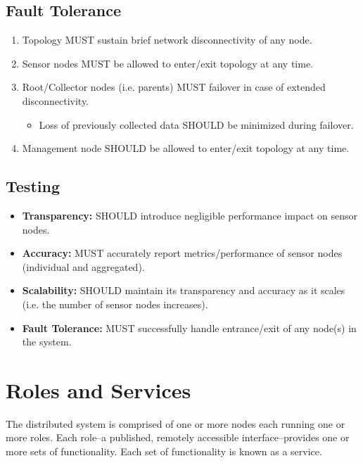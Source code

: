 \subsection{Fault Tolerance}

\begin{enumerate}

\item Topology MUST sustain brief network disconnectivity of any node.
\item Sensor nodes MUST be allowed to enter/exit topology at any time.
\item Root/Collector nodes (i.e. parents) MUST failover in case of extended disconnectivity.
      \begin{itemize}
      \item Loss of previously collected data SHOULD be minimized during failover.
      \end{itemize}
\item Management node SHOULD be allowed to enter/exit topology at any time.

\end{enumerate}

\subsection{Testing}

\begin{itemize}

\item \textbf{Transparency:} \dcamp SHOULD introduce negligible performance impact on sensor nodes.
\item \textbf{Accuracy:} \dcamp MUST accurately report metrics/performance of sensor nodes (individual and aggregated).
\item \textbf{Scalability:} \dcamp SHOULD maintain its transparency and accuracy as it scales (i.e. the number of sensor
      nodes increases).
\item \textbf{Fault Tolerance:} \dcamp MUST successfully handle entrance/exit of any node(s) in the system.

\end{itemize}

\section{\dcamp Roles and Services}
\label{roles_and_services}

The \dcamp distributed system is comprised of one or more nodes each running one or more roles. Each role--a published,
remotely accessible interface--provides one or more sets of functionality. Each set of functionality is known as a
service.


